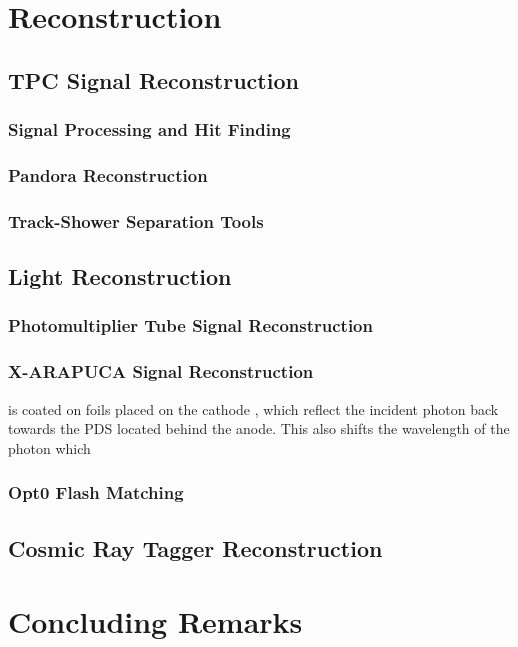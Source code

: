 
\section{Reconstruction}

\subsection{TPC Signal Reconstruction}

\subsubsection{Signal Processing and Hit Finding}

\subsubsection{Pandora Reconstruction}

\subsubsection{Track-Shower Separation Tools}

\subsection{Light Reconstruction}

\subsubsection{Photomultiplier Tube Signal Reconstruction}

\subsubsection{X-ARAPUCA Signal Reconstruction}

is coated on foils placed on the cathode
, which reflect the incident photon back towards the PDS located behind the anode. 
This also shifts the wavelength of the photon which 



\subsubsection{Opt0 Flash Matching}

\subsection{Cosmic Ray Tagger Reconstruction}


\section{Concluding Remarks}
